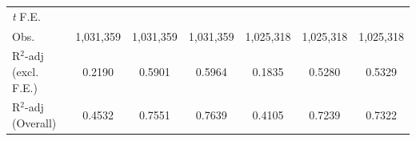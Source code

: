 \begin{tabular}{lcccccc}
		\\
		\textit{t} F.E. & \checkmark & \checkmark & \checkmark & \checkmark & \checkmark & \checkmark
		\\
		Obs. & 1,031,359 & 1,031,359 & 1,031,359 & 1,025,318 & 1,025,318 & 1,025,318
		\\
		\makecell[tl]{R$^2$-adj\\(excl. F.E.)} & 0.2190 & 0.5901 & 0.5964 & 0.1835 & 0.5280 & 0.5329
		\\
		\makecell[tl]{R$^2$-adj\\(Overall)} & 0.4532 & 0.7551 & 0.7639 & 0.4105 & 0.7239 & 0.7322
		\\
		\bottomrule
	\end{tabular}
